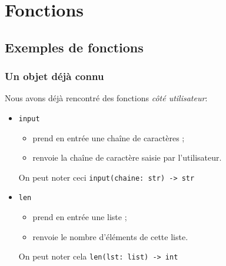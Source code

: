 \chapter{Fonctions}
\section{Exemples de fonctions}
\subsection{Un objet déjà connu}
Nous avons déjà rencontré des fonctions \textit{côté utilisateur}:
\begin{itemize}
    \item \texttt{input}
          \begin{itemize}
              \item prend en entrée une chaîne de caractères ;
              \item renvoie la chaîne de caractère saisie par l'utilisateur.
          \end{itemize}
          On peut noter ceci \texttt{input(chaine: str) -> str}
    \item \texttt{len}
          \begin{itemize}
              \item prend en entrée une liste ;
              \item renvoie le nombre d'éléments de cette liste.
          \end{itemize}
          On peut noter cela \texttt{len(lst: list) -> int}
\end{itemize}


